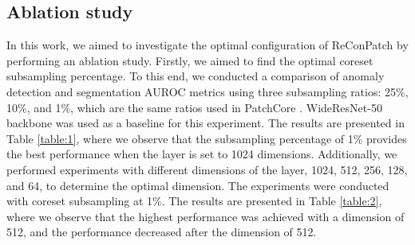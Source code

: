 \documentclass[10pt,onecolumn,letterpaper]{article}
\begin{document}
\begin{table}[]
\caption{Ablation study results using a larger backbone model, more hierarchy levels, larger patch size, and larger image size on the MVTec AD dataset with our proposed ReConPatch model.}
\label{table:3}
\end{table}

\subsection{Ablation study} \label{ablation}
In this work, we aimed to investigate the optimal configuration of ReConPatch by performing an ablation study. Firstly, we aimed to find the optimal coreset subsampling percentage. To this end, we conducted a comparison of anomaly detection and segmentation AUROC metrics using three subsampling ratios: 25\%, 10\%, and 1\%, which are the same ratios used in PatchCore \cite{roth2022towards}. WideResNet-50 \cite{zagoruyko2016wide} backbone was used as a baseline for this experiment. The results are presented in Table \ref{table:1}, where we observe that the subsampling percentage of 1\% provides the best performance when the  layer is set to 1024 dimensions.
Additionally, we performed experiments with different dimensions of the  layer, 1024, 512, 256, 128, and 64, to determine the optimal dimension. The experiments were conducted with coreset subsampling at 1\%. The results are presented in Table \ref{table:2}, where we observe that the highest performance was achieved with a dimension of 512, and the performance decreased after the dimension of 512.
\end{document}

